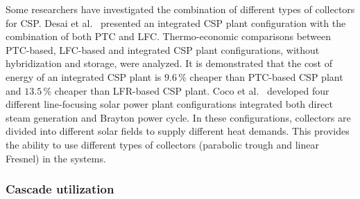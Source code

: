 
Some researchers have investigated the combination of different types of collectors for CSP.
Desai et al.~\cite{Desai2015} presented an integrated CSP plant configuration with the combination of both PTC and LFC. Thermo-economic comparisons between PTC-based, LFC-based and integrated CSP plant configurations, without hybridization and storage, were analyzed.  It is demonstrated that the cost of energy of an integrated CSP plant is $9.6\,\%$ cheaper than PTC-based CSP plant and $13.5\,\%$ cheaper than LFR-based CSP plant.
Coco et al.~\cite{Coco2015} developed four different line-focusing solar power plant configurations integrated both direct steam generation and Brayton power cycle. In these configurations, collectors are divided into different solar fields to supply different heat demands. This provides the ability to use different types of collectors (parabolic trough and linear Fresnel) in the systems.

\subsubsection{Cascade utilization}


